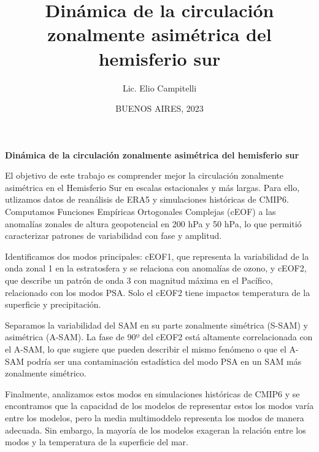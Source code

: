 \documentclass[12pt,oneside]{reedthesis}
\title{Dinámica de la circulación zonalmente asimétrica del hemisferio sur}
\author{Lic. Elio Campitelli}
\date{BUENOS AIRES, 2023}
\begin{document}
  \maketitle

\frontmatter %
\pagestyle{empty} %


  \begin{resumen}
    \textbf{Dinámica de la circulación zonalmente asimétrica del hemisferio sur}

    El objetivo de este trabajo es comprender mejor la circulación zonalmente asimétrica en el Hemisferio Sur en escalas estacionales y más largas. Para ello, utlizamos datos de reanálisis de ERA5 y simulaciones históricas de CMIP6. Computamos Funciones Empíricas Ortogonales Complejas (cEOF) a las anomalías zonales de altura geopotencial en 200 hPa y 50 hPa, lo que permitió caracterizar patrones de variabilidad con fase y amplitud.

    Identificamos dos modos principales: cEOF1, que representa la variabilidad de la onda zonal 1 en la estratosfera y se relaciona con anomalías de ozono, y cEOF2, que describe un patrón de onda 3 con magnitud máxima en el Pacífico, relacionado con los modos PSA.
    Solo el cEOF2 tiene impactos temperatura de la superficie y precipitación.

    Separamos la variabilidad del SAM en su parte zonalmente simétrica (S-SAM) y asimétrica (A-SAM).
    La fase de 90º del cEOF2 está altamente correlacionada con el A-SAM, lo que sugiere que pueden describir el mismo fenómeno o que el A-SAM podría ser una contaminación estadística del modo PSA en un SAM más zonalmente simétrico.

    Finalmente, analizamos estos modos en simulaciones históricas de CMIP6 y se encontramos que la capacidad de los modelos de representar estos los modos varía entre los modelos, pero la media multimoddelo representa los modos de manera adecuada.
    Sin embargo, la mayoría de los modelos exageran la relación entre los modos y la temperatura de la superficie del mar.
  \end{resumen}
\end{document}
